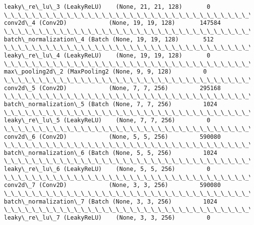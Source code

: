 \documentclass[11pt]{article}
\begin{document}
\begin{Verbatim}[commandchars=\\\{\}]
leaky\_re\_lu\_3 (LeakyReLU)    (None, 21, 21, 128)       0         
\_\_\_\_\_\_\_\_\_\_\_\_\_\_\_\_\_\_\_\_\_\_\_\_\_\_\_\_\_\_\_\_\_\_\_\_\_\_\_\_\_\_\_\_\_\_\_\_\_\_\_\_\_\_\_\_\_\_\_\_\_\_\_\_\_
conv2d\_4 (Conv2D)            (None, 19, 19, 128)       147584    
\_\_\_\_\_\_\_\_\_\_\_\_\_\_\_\_\_\_\_\_\_\_\_\_\_\_\_\_\_\_\_\_\_\_\_\_\_\_\_\_\_\_\_\_\_\_\_\_\_\_\_\_\_\_\_\_\_\_\_\_\_\_\_\_\_
batch\_normalization\_4 (Batch (None, 19, 19, 128)       512       
\_\_\_\_\_\_\_\_\_\_\_\_\_\_\_\_\_\_\_\_\_\_\_\_\_\_\_\_\_\_\_\_\_\_\_\_\_\_\_\_\_\_\_\_\_\_\_\_\_\_\_\_\_\_\_\_\_\_\_\_\_\_\_\_\_
leaky\_re\_lu\_4 (LeakyReLU)    (None, 19, 19, 128)       0         
\_\_\_\_\_\_\_\_\_\_\_\_\_\_\_\_\_\_\_\_\_\_\_\_\_\_\_\_\_\_\_\_\_\_\_\_\_\_\_\_\_\_\_\_\_\_\_\_\_\_\_\_\_\_\_\_\_\_\_\_\_\_\_\_\_
max\_pooling2d\_2 (MaxPooling2 (None, 9, 9, 128)         0         
\_\_\_\_\_\_\_\_\_\_\_\_\_\_\_\_\_\_\_\_\_\_\_\_\_\_\_\_\_\_\_\_\_\_\_\_\_\_\_\_\_\_\_\_\_\_\_\_\_\_\_\_\_\_\_\_\_\_\_\_\_\_\_\_\_
conv2d\_5 (Conv2D)            (None, 7, 7, 256)         295168    
\_\_\_\_\_\_\_\_\_\_\_\_\_\_\_\_\_\_\_\_\_\_\_\_\_\_\_\_\_\_\_\_\_\_\_\_\_\_\_\_\_\_\_\_\_\_\_\_\_\_\_\_\_\_\_\_\_\_\_\_\_\_\_\_\_
batch\_normalization\_5 (Batch (None, 7, 7, 256)         1024      
\_\_\_\_\_\_\_\_\_\_\_\_\_\_\_\_\_\_\_\_\_\_\_\_\_\_\_\_\_\_\_\_\_\_\_\_\_\_\_\_\_\_\_\_\_\_\_\_\_\_\_\_\_\_\_\_\_\_\_\_\_\_\_\_\_
leaky\_re\_lu\_5 (LeakyReLU)    (None, 7, 7, 256)         0         
\_\_\_\_\_\_\_\_\_\_\_\_\_\_\_\_\_\_\_\_\_\_\_\_\_\_\_\_\_\_\_\_\_\_\_\_\_\_\_\_\_\_\_\_\_\_\_\_\_\_\_\_\_\_\_\_\_\_\_\_\_\_\_\_\_
conv2d\_6 (Conv2D)            (None, 5, 5, 256)         590080    
\_\_\_\_\_\_\_\_\_\_\_\_\_\_\_\_\_\_\_\_\_\_\_\_\_\_\_\_\_\_\_\_\_\_\_\_\_\_\_\_\_\_\_\_\_\_\_\_\_\_\_\_\_\_\_\_\_\_\_\_\_\_\_\_\_
batch\_normalization\_6 (Batch (None, 5, 5, 256)         1024      
\_\_\_\_\_\_\_\_\_\_\_\_\_\_\_\_\_\_\_\_\_\_\_\_\_\_\_\_\_\_\_\_\_\_\_\_\_\_\_\_\_\_\_\_\_\_\_\_\_\_\_\_\_\_\_\_\_\_\_\_\_\_\_\_\_
leaky\_re\_lu\_6 (LeakyReLU)    (None, 5, 5, 256)         0         
\_\_\_\_\_\_\_\_\_\_\_\_\_\_\_\_\_\_\_\_\_\_\_\_\_\_\_\_\_\_\_\_\_\_\_\_\_\_\_\_\_\_\_\_\_\_\_\_\_\_\_\_\_\_\_\_\_\_\_\_\_\_\_\_\_
conv2d\_7 (Conv2D)            (None, 3, 3, 256)         590080    
\_\_\_\_\_\_\_\_\_\_\_\_\_\_\_\_\_\_\_\_\_\_\_\_\_\_\_\_\_\_\_\_\_\_\_\_\_\_\_\_\_\_\_\_\_\_\_\_\_\_\_\_\_\_\_\_\_\_\_\_\_\_\_\_\_
batch\_normalization\_7 (Batch (None, 3, 3, 256)         1024      
\_\_\_\_\_\_\_\_\_\_\_\_\_\_\_\_\_\_\_\_\_\_\_\_\_\_\_\_\_\_\_\_\_\_\_\_\_\_\_\_\_\_\_\_\_\_\_\_\_\_\_\_\_\_\_\_\_\_\_\_\_\_\_\_\_
leaky\_re\_lu\_7 (LeakyReLU)    (None, 3, 3, 256)         0         

\end{Verbatim}
\end{document}

